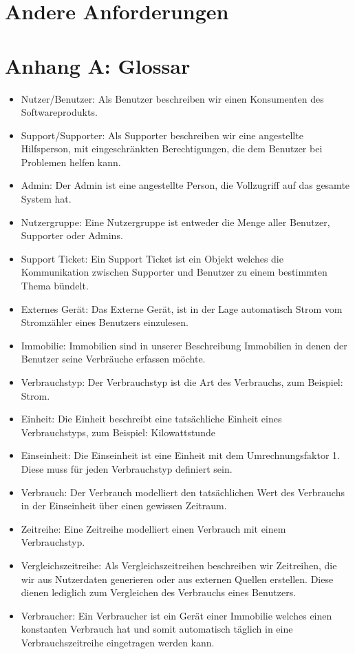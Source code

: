 \section{Andere Anforderungen}
\section*{Anhang A: Glossar}
\label{glossar}
\begin{itemize}
	\item Nutzer/Benutzer: Als Benutzer beschreiben wir einen Konsumenten des Softwareprodukts.
	\item Support/Supporter: Als Supporter beschreiben wir eine angestellte Hilfsperson, mit eingeschränkten Berechtigungen, die dem Benutzer bei Problemen helfen kann.
	\item Admin: Der Admin ist eine angestellte Person, die Vollzugriff auf das gesamte System hat.
	\item Nutzergruppe: Eine Nutzergruppe ist entweder die Menge aller Benutzer, Supporter oder Admins.
	\item Support Ticket: Ein Support Ticket ist ein Objekt welches die Kommunikation zwischen Supporter und Benutzer zu einem bestimmten Thema bündelt.
	\item Externes Gerät: Das Externe Gerät, ist in der Lage automatisch Strom vom Stromzähler eines Benutzers einzulesen.
	\item Immobilie: Immobilien sind in unserer Beschreibung Immobilien in denen der Benutzer seine Verbräuche erfassen möchte.
	\item Verbrauchstyp: Der Verbrauchstyp ist die Art des Verbrauchs, zum Beispiel: Strom.
	\item Einheit: Die Einheit beschreibt eine tatsächliche Einheit eines Verbrauchstyps, zum Beispiel: Kilowattstunde
	\item Einseinheit: Die Einseinheit ist eine Einheit mit dem Umrechnungsfaktor 1. Diese muss für jeden Verbrauchstyp definiert sein.
	\item Verbrauch: Der Verbrauch modelliert den tatsächlichen Wert des Verbrauchs in der Einseinheit über einen gewissen Zeitraum.
	\item Zeitreihe: Eine Zeitreihe modelliert einen Verbrauch mit einem Verbrauchstyp.
	\item Vergleichszeitreihe: Als Vergleichszeitreihen beschreiben wir Zeitreihen, die wir aus Nutzerdaten generieren oder aus externen Quellen erstellen. Diese dienen lediglich zum Vergleichen des Verbrauchs eines Benutzers.
	\item Verbraucher: Ein Verbraucher ist ein Gerät einer Immobilie welches einen konstanten Verbrauch hat und somit automatisch täglich in eine Verbrauchszeitreihe eingetragen werden kann.
\end{itemize}
